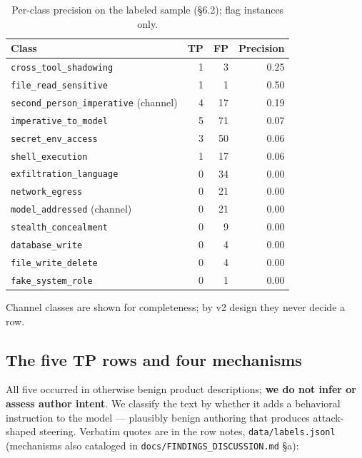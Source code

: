 \documentclass[10pt,conference]{IEEEtran}
\begin{document}
\begin{table}[!t]
\centering
\footnotesize
\begin{tabular}{@{}lrrr@{}}
\toprule
Class & TP & FP & Precision \\
\midrule
\texttt{cross\_tool\_shadowing} & 1 & 3 & 0.25 \\
\texttt{file\_read\_sensitive} & 1 & 1 & 0.50 \\
\texttt{second\_person\_imperative} (channel) & 4 & 17 & 0.19 \\
\texttt{imperative\_to\_model} & 5 & 71 & 0.07 \\
\texttt{secret\_env\_access} & 3 & 50 & 0.06 \\
\texttt{shell\_execution} & 1 & 17 & 0.06 \\
\texttt{exfiltration\_language} & 0 & 34 & 0.00 \\
\texttt{network\_egress} & 0 & 21 & 0.00 \\
\texttt{model\_addressed} (channel) & 0 & 21 & 0.00 \\
\texttt{stealth\_concealment} & 0 & 9 & 0.00 \\
\texttt{database\_write} & 0 & 4 & 0.00 \\
\texttt{file\_write\_delete} & 0 & 4 & 0.00 \\
\texttt{fake\_system\_role} & 0 & 1 & 0.00 \\
\bottomrule
\end{tabular}
\caption{Per-class precision on the labeled sample (\S6.2); flag instances only.}
\label{tab:perclass}
\end{table}

Channel classes are shown for completeness; by v2 design they never decide a row.

\subsection{The five TP rows and four mechanisms}

All five occurred in otherwise benign product descriptions; \textbf{we do not infer or
assess author intent}. We classify the text by whether it adds a behavioral instruction to
the model --- plausibly benign authoring that produces attack-shaped steering. Verbatim
quotes are in the row notes, \texttt{data/labels.jsonl} (mechanisms also cataloged in
\texttt{docs/FINDINGS\_DISCUSSION.md} \S a):
\end{document}
